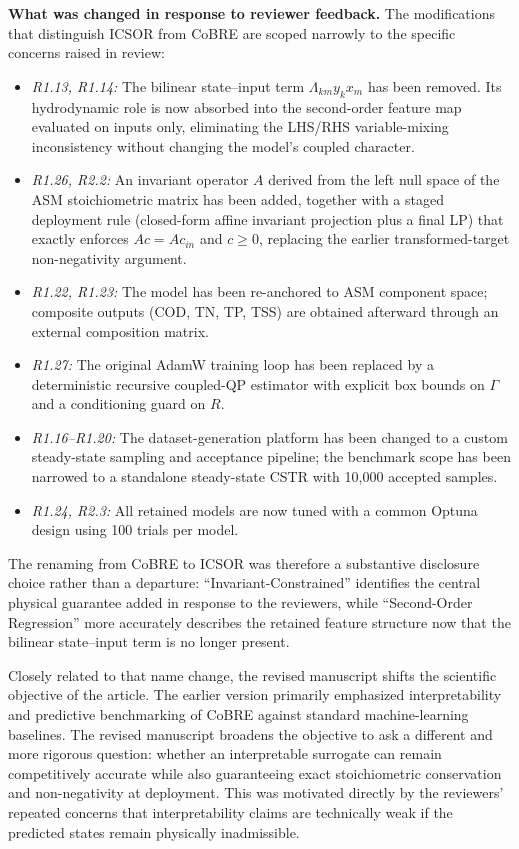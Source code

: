 \documentclass[a4paper,11pt]{article}
\begin{document}
\textbf{What was changed in response to reviewer feedback.} The modifications that distinguish ICSOR from CoBRE are scoped narrowly to the specific concerns raised in review:
\begin{itemize}[nosep]
\item \textit{R1.13, R1.14:} The bilinear state--input term $\Lambda_{km} y_k x_m$ has been removed. Its hydrodynamic role is now absorbed into the second-order feature map evaluated on inputs only, eliminating the LHS/RHS variable-mixing inconsistency without changing the model's coupled character.
\item \textit{R1.26, R2.2:} An invariant operator $A$ derived from the left null space of the ASM stoichiometric matrix has been added, together with a staged deployment rule (closed-form affine invariant projection plus a final LP) that exactly enforces $Ac = Ac_{in}$ and $c \ge 0$, replacing the earlier transformed-target non-negativity argument.
\item \textit{R1.22, R1.23:} The model has been re-anchored to ASM component space; composite outputs (COD, TN, TP, TSS) are obtained afterward through an external composition matrix.
\item \textit{R1.27:} The original AdamW training loop has been replaced by a deterministic recursive coupled-QP estimator with explicit box bounds on $\Gamma$ and a conditioning guard on $R$.
\item \textit{R1.16--R1.20:} The dataset-generation platform has been changed to a custom steady-state sampling and acceptance pipeline; the benchmark scope has been narrowed to a standalone steady-state CSTR with 10{,}000 accepted samples.
\item \textit{R1.24, R2.3:} All retained models are now tuned with a common Optuna design using 100 trials per model.
\end{itemize}

The renaming from CoBRE to ICSOR was therefore a substantive disclosure choice rather than a departure: ``Invariant-Constrained'' identifies the central physical guarantee added in response to the reviewers, while ``Second-Order Regression'' more accurately describes the retained feature structure now that the bilinear state--input term is no longer present.

Closely related to that name change, the revised manuscript shifts the scientific objective of the article. The earlier version primarily emphasized interpretability and predictive benchmarking of CoBRE against standard machine-learning baselines. The revised manuscript broadens the objective to ask a different and more rigorous question: whether an interpretable surrogate can remain competitively accurate while also guaranteeing exact stoichiometric conservation and non-negativity at deployment. This was motivated directly by the reviewers' repeated concerns that interpretability claims are technically weak if the predicted states remain physically inadmissible.
\end{document}

